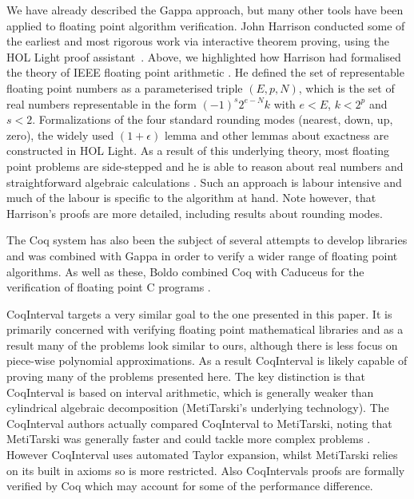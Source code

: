 \documentclass{fac}
\begin{document}
We have already described the Gappa approach, but many other tools have been applied to floating point algorithm verification. John Harrison conducted some of the earliest and most rigorous work via interactive theorem proving, using the HOL Light proof assistant~\cite{harrison1997floating}. Above, we highlighted how Harrison had formalised the theory of IEEE floating point arithmetic \cite{harrison1999machine}. He defined the set of representable floating point numbers as a parameterised triple $(E,p,N)$, which is the set of real numbers representable in the form $(-1)^s 2^{e-N} k$ with $e<E$, $k<2^p$ and $s<2$. Formalizations of the four standard rounding modes (nearest, down, up, zero), the widely used $(1+\epsilon)$ lemma and other lemmas about exactness are constructed in HOL Light. As a result of this underlying theory, most floating point problems are side-stepped and he is able to reason about real numbers and straightforward algebraic calculations \cite{harrison1999machine}. Such an approach is labour intensive and much of the labour is specific to the algorithm at hand. Note however, that Harrison's proofs are more detailed, including results about rounding modes. 

 The Coq system has also been the subject of several attempts to develop libraries \cite{daumas2001generic,melquiond2012floating,boldo2011flocq} and was combined with Gappa \cite{boldo2009combining,daumas2010certification} in order to verify a wider range of floating point algorithms. As well as these, Boldo combined Coq with Caduceus for the verification of floating point C programs \cite{boldo2007formal}.
 
 CoqInterval \cite{martin2016proving} targets a very similar goal to the one presented in this paper. It is primarily concerned with verifying floating point mathematical libraries and as a result many of the problems look similar to ours, although there is less focus on piece-wise polynomial approximations. As a result CoqInterval is likely capable of proving many of the problems presented here. The key distinction is that CoqInterval is based on interval arithmetic, which is generally weaker than cylindrical algebraic decomposition (MetiTarski's underlying technology). The CoqInterval authors actually compared CoqInterval to MetiTarski, noting that MetiTarski was generally faster and could tackle more complex problems \cite{martin2016proving}. However CoqInterval uses automated Taylor expansion, whilst MetiTarski relies on its built in axioms so is more restricted. Also CoqIntervals proofs are formally verified by Coq which may account for some of the performance difference. 
 
\end{document}
